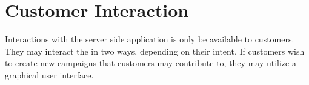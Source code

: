
\section{Customer Interaction}


Interactions with the server side application is only be available to customers. They may interact the in two ways, depending on their intent. If customers wish to create new campaigns that customers may contribute to, they may utilize a graphical user interface. 